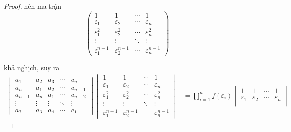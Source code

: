 \begin{proof}
    nên ma trận
    \[
        \begin{pmatrix}
            1                     & 1                     & \cdots & 1                     \\
            \varepsilon_{1}       & \varepsilon_{2}       & \cdots & \varepsilon_{n}       \\
            \varepsilon_{1}^{2}   & \varepsilon_{2}^{2}   & \cdots & \varepsilon_{n}^{2}   \\
            \vdots                & \vdots                & \ddots & \vdots                \\
            \varepsilon_{1}^{n-1} & \varepsilon_{2}^{n-1} & \cdots & \varepsilon_{n}^{n-1}
        \end{pmatrix}
    \]
    
    khả nghịch, suy ra
    \begin{align*}
        \begin{vmatrix}
            a_{1}   & a_{2}  & a_{3}  & \cdots & a_{n}   \\
            a_{n}   & a_{1}  & a_{2}  & \cdots & a_{n-1} \\
            a_{n-1} & a_{n}  & a_{1}  & \cdots & a_{n-2} \\
            \vdots  & \vdots & \vdots & \ddots & \vdots  \\
            a_{2}   & a_{3}  & a_{4}  & \cdots & a_{1}
        \end{vmatrix}
        \begin{vmatrix}
            1                     & 1                     & \cdots & 1                     \\
            \varepsilon_{1}       & \varepsilon_{2}       & \cdots & \varepsilon_{n}       \\
            \varepsilon_{1}^{2}   & \varepsilon_{2}^{2}   & \cdots & \varepsilon_{n}^{2}   \\
            \vdots                & \vdots                & \ddots & \vdots                \\
            \varepsilon_{1}^{n-1} & \varepsilon_{2}^{n-1} & \cdots & \varepsilon_{n}^{n-1}
        \end{vmatrix}
         & =
        \prod^{n}_{i=1}f(\varepsilon_{i})
        \begin{vmatrix}
            1                     & 1                     & \cdots & 1                     \\
            \varepsilon_{1}       & \varepsilon_{2}       & \cdots & \varepsilon_{n}       \\

\end{vmatrix}
\end{align*}
\end{proof}
